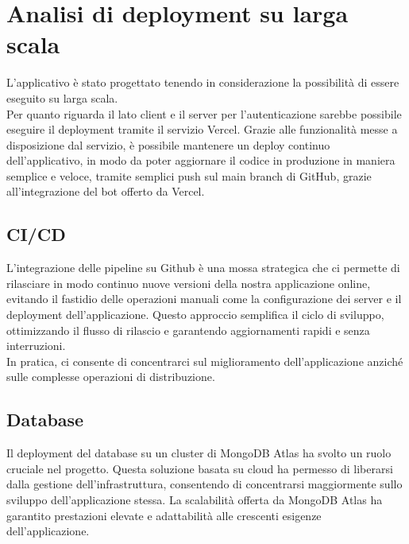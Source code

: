 

\section{Analisi di deployment su larga scala}

L'applicativo è stato progettato tenendo in considerazione la possibilità di essere eseguito su larga scala.\\

Per quanto riguarda il lato client e il server per l'autenticazione sarebbe possibile eseguire il deployment tramite il servizio Vercel.
Grazie alle funzionalità messe a disposizione dal servizio, è possibile mantenere un deploy continuo dell'applicativo,
in modo da poter aggiornare il codice in produzione in maniera semplice e veloce, tramite semplici push sul main branch di GitHub,
grazie all'integrazione del bot offerto da Vercel.\\

\subsection{CI/CD}

L'integrazione delle pipeline su Github è una mossa strategica che ci permette di
rilasciare in modo continuo nuove versioni della nostra applicazione online, evitando
il fastidio delle operazioni manuali come la configurazione dei server e il deployment
dell'applicazione. Questo approccio semplifica il ciclo di sviluppo, ottimizzando
il flusso di rilascio e garantendo aggiornamenti rapidi e senza interruzioni. \\

In pratica, ci consente di concentrarci sul miglioramento dell'applicazione anziché
sulle complesse operazioni di distribuzione.

\subsection{Database}
Il deployment del database su un cluster di MongoDB Atlas ha svolto un ruolo cruciale nel progetto.
Questa soluzione basata su cloud ha permesso di liberarsi dalla gestione dell'infrastruttura, consentendo
di concentrarsi maggiormente sullo sviluppo dell'applicazione stessa. La scalabilità offerta da MongoDB
Atlas ha garantito prestazioni elevate e adattabilità alle crescenti esigenze dell'applicazione.\\

